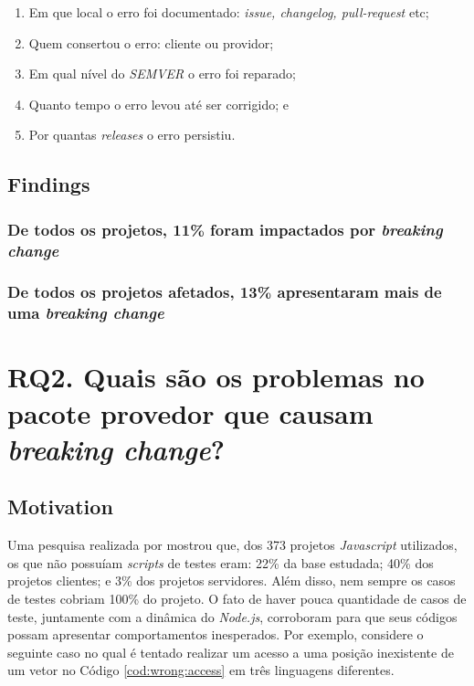 \begin{enumerate}
    \item Em que local o erro foi documentado: \textit{issue, changelog, pull-request} etc;
    \item Quem consertou o erro: cliente ou providor;
    \item Em qual nível do \textit{SEMVER} o erro foi reparado;
    \item Quanto tempo o erro levou até ser corrigido; e
    \item Por quantas \textit{releases} o erro persistiu.
\end{enumerate}{}

\subsection{Findings}
\label{fin:rq1}

\subsubsection{De todos os projetos, 11\% foram impactados por \textit{breaking change}}

\subsubsection{De todos os projetos afetados, 13\% apresentaram mais de uma \textit{breaking change}}

\section{RQ2. Quais são os problemas no pacote provedor que causam \textit{breaking change}?}
\label{sec:rq2}

\subsection{Motivation}
\label{mot:rq2}

Uma pesquisa realizada por  mostrou que, dos 373 projetos \textit{Javascript} utilizados, os que não possuíam \textit{scripts} de testes eram: 22\% da base estudada; 40\% dos projetos clientes; e 3\% dos projetos servidores. Além disso, nem sempre os casos de testes cobriam 100\% do projeto. O fato de haver pouca quantidade de casos de teste, juntamente com a dinâmica do \textit{Node.js}, corroboram para que seus códigos possam apresentar comportamentos inesperados. Por exemplo, considere o seguinte caso no qual é tentado realizar um acesso a uma posição inexistente de um vetor no Código \ref{cod:wrong:access} em três linguagens diferentes.

